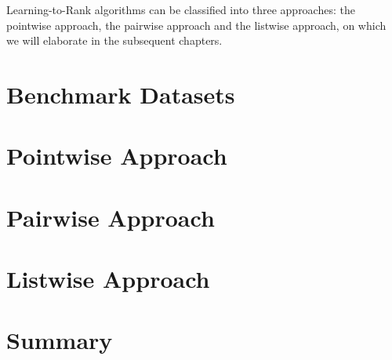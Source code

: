 Learning-to-Rank algorithms can be classified into three approaches: the pointwise approach, the pairwise approach and the listwise approach, on which we will elaborate in the subsequent chapters.

\chapter{Benchmark Datasets}
\chapter{Pointwise Approach}
\chapter{Pairwise Approach}
\chapter{Listwise Approach}
\chapter{Summary}